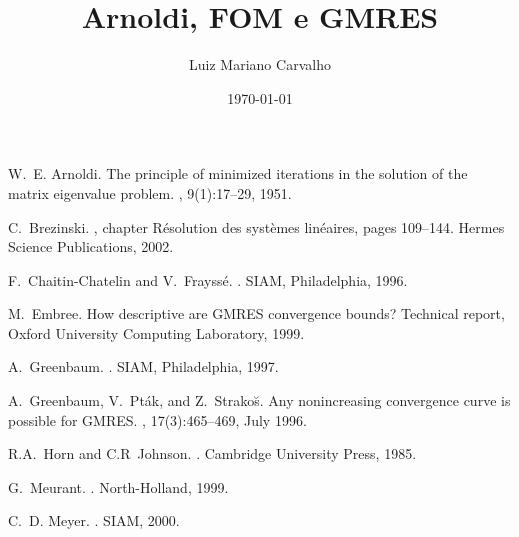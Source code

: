 \documentclass{article}
\title{Arnoldi, FOM e GMRES}
\author{ Luiz Mariano  Carvalho }
\date{\today
}
\begin{document}
	
\maketitle







\begin{thebibliography}{100}
	
     W.~E. Arnoldi. \newblock The principle of minimized iterations in the solution of the
    matrix
  eigenvalue problem.
, 9(1):17--29, 1951.

     C.~Brezinski. ,
    chapter
  Résolution des systèmes linéaires, pages 109--144.
\newblock Hermes Science Publications, 2002.


 F.~{Chaitin-Chatelin} and V.~Frayssé. . \newblock SIAM, Philadelphia, 1996.

 M.~Embree. \newblock How descriptive are {GMRES} convergence bounds? \newblock Technical
report, Oxford University Computing Laboratory, 1999.

	
     A.~Greenbaum. .
    \newblock SIAM, Philadelphia, 1997.
	
	 A.~Greenbaum, V.~Pták, and Z.~Strako{\u{s}}. \newblock Any nonincreasing
	convergence curve is possible for {GMRES}. ,
	17(3):465--469, July 1996.
	
   R.A.~Horn and C.R~Johnson. . \newblock
  Cambridge University Press, 1985.

		
	



	

     G.~Meurant. . \newblock
    North-Holland, 1999.

	
	 C.~D. Meyer. . \newblock SIAM,
	2000.
	

\end{thebibliography}
\end{document}
